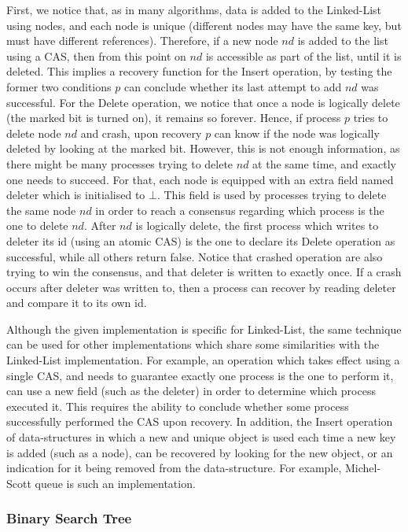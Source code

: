 First, we notice that, as in many algorithms, data is added to the Linked-List using nodes, and each node is unique (different nodes may have the same key, but must have different references). Therefore, if a new node $nd$ is added to the list using a CAS, then from this point on $nd$ is accessible as part of the list, until it is deleted. This implies a recovery function for the Insert operation, by testing the former two conditions $p$ can conclude whether its last attempt to add $nd$ was successful. For the Delete operation, we notice that once a node is logically delete (the marked bit is turned on), it remains so forever. Hence, if process $p$ tries to delete node $nd$ and crash, upon recovery $p$ can know if the node was logically deleted by looking at the marked bit. However, this is not enough information, as there might be many processes trying to delete $nd$ at the same time, and exactly one needs to succeed. For that, each node is equipped with an extra field named deleter which is initialised to $\bot$. This field is used by processes trying to delete the same node $nd$ in order to reach a consensus regarding which process is the one to delete $nd$. After $nd$ is logically delete, the first process which writes to deleter its id (using an atomic CAS) is the one to declare its Delete operation as successful, while all others return false. Notice that crashed operation are also trying to win the consensus, and that deleter is written to exactly once. If a crash occurs after deleter was written to, then a process can recover by reading deleter and compare it to its own id.

Although the given implementation is specific for Linked-List, the same technique can be used for other implementations which share some similarities with the Linked-List implementation. For example, an operation which takes effect using a single CAS, and needs to guarantee exactly one process is the one to perform it, can use a new field (such as the deleter) in order to determine which process executed it. This requires the ability to conclude whether some process successfully performed the CAS upon recovery. In addition, the Insert operation of data-structures in which a new and unique object is used each time a new key is added (such as a node), can be recovered by looking for the new object, or an indication for it being removed from the data-structure. For example, Michel-Scott queue is such an implementation.


\subsubsection*{Binary Search Tree}

